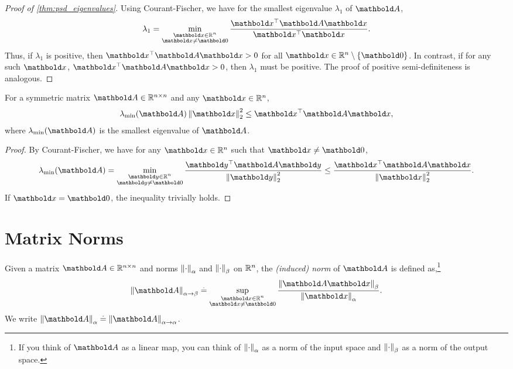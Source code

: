\begin{proof}[Proof of \cref{thm:psd_eigenvalues}] Using Courant-Fischer, we have for the smallest eigenvalue $\lambda_1$ of $\mA$, \begin{align*}
    \lambda_1 = \min_{\substack{\vx \in \R^n \\ \vx \neq \vZero}} \frac{\trans{\vx}\mA\vx}{\trans{\vx}\vx}.
\end{align*} Thus, if $\lambda_1$ is positive, then $\trans{\vx}\mA\vx > 0$ for all $\vx \in \R^n \setminus \{\vZero\}$. In contrast, if for any such $\vx$, $\trans{\vx}\mA\vx > 0$, then $\lambda_1$ must be positive. The proof of positive semi-definiteness is analogous.
\end{proof}

\begin{cor}\label{lem:quadratic_form_lower_bound}
    For a symmetric matrix $\mA \in \R^{n \times n}$ and any $\vx \in \R^n$, \begin{align}
        \lambda_{\min}(\mA) \norm{\vx}_2^2 \leq \trans{\vx}\mA\vx,
    \end{align} where $\lambda_{\min}(\mA)$ is the smallest eigenvalue of $\mA$.
\end{cor}
\begin{proof}
By Courant-Fischer, we have for any $\vx \in \R^n$ such that $\vx \neq \vZero$, \begin{align*}
    \lambda_{\min}(\mA) = \min_{\substack{\vy \in \R^n \\ \vy \neq \vZero}} \frac{\trans{\vy}\mA\vy}{\norm{\vy}_2^2} \leq \frac{\trans{\vx}\mA\vx}{\norm{\vx}_2^2}.
\end{align*} If $\vx = \vZero$, the inequality trivially holds.
\end{proof}

\section{Matrix Norms}

\begin{defn} Given a matrix $\mA \in \R^{n \times n}$ and norms $\left\| \cdot \right\|_\alpha$ and $\left\| \cdot \right\|_\beta$ on $\mathbb{R}^n$, the \emph{(induced) norm} of $\mA$ is defined as,\footnote{If you think of $\mA$ as a linear map, you can think of $\left\| \cdot \right\|_\alpha$ as a norm of the input space and $\left\| \cdot \right\|_\beta$ as a norm of the output space.} \begin{align}
    \norm{\mA}_{\alpha\to\beta} \defeq \sup_{\substack{\vx \in \R^n \\ \vx \neq \vZero}} \frac{\norm{\mA\vx}_\beta}{\norm{\vx}_\alpha}.
\end{align} We write $\norm{\mA}_\alpha \defeq \norm{\mA}_{\alpha\to\alpha}$.
\end{defn}

